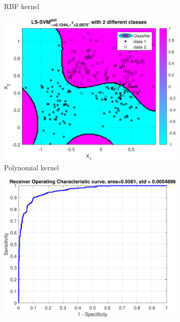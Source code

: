 \documentclass{article}
\begin{document}
\begin{figure}[H]
\begin{subfigure}[b]{0.3\textwidth}
                    \caption{RBF kernel}
                     \label{fig:ripley_rbf_result}
                 \end{subfigure}
                 \hfill
                 \begin{subfigure}[b]{0.3\textwidth}
                     \centering
                     \includegraphics[width=\textwidth]{Assignment 1/figures/ripley_simplex_polynomial_classification_result.pdf}
                    \caption{Polynomial kernel}
                     \label{fig:ripley_poly_result}
                 \end{subfigure}
                 \hfill
                 \begin{subfigure}[b]{0.3\textwidth}
                     \centering
                     \includegraphics[width=\textwidth]{Assignment 1/figures/ripley_simplex_linear_classifier_roc.pdf}

\end{subfigure}
\end{figure}
\end{document}
